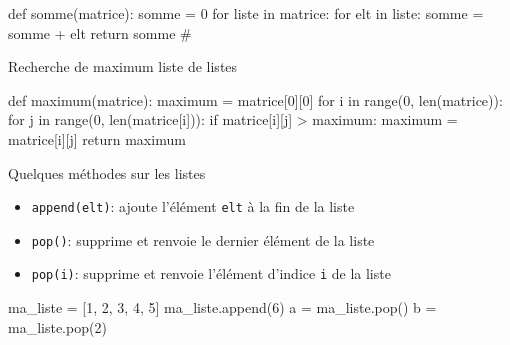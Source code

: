 \begin{minipage}{0.44\linewidth}
\begin{easybox}{}
		\begin{CodePythontexAlt}[TaillePolice=\normalsize, Largeur=1\linewidth,Centre,PremLigne=1, Lignes=false]{}
def somme(matrice):
	somme = 0
	for liste in matrice:
		for elt in liste:
			somme = somme + elt
	return somme
#
		\end{CodePythontexAlt}
\end{easybox}
\end{minipage}\hfill
	\begin{minipage}{0.55\linewidth}
		\begin{easybox}{Recherche de maximum liste de listes}{}
\begin{CodePythontexAlt}[TaillePolice=\normalsize, Largeur=1\linewidth,Centre,PremLigne=1, Lignes=false]{}
def maximum(matrice):
	maximum = matrice[0][0]
	for i in range(0, len(matrice)):
		for j in range(0, len(matrice[i])):
			if matrice[i][j] > maximum:
				maximum = matrice[i][j]
	return maximum
\end{CodePythontexAlt}
	\end{easybox}
	\end{minipage}


\begin{easybox}{Quelques méthodes sur les listes}{}

	\begin{minipage}{0.65\linewidth}
		\begin{itemize}
\item \verb|append(elt)|: ajoute l'élément \verb|elt| à la fin de la liste	
\item \verb|pop()|: supprime et renvoie le dernier élément de la liste
\item \verb|pop(i)|: supprime et renvoie l'élément d'indice \verb|i| de la liste
\end{itemize}

	\end{minipage}\hfill
	\begin{minipage}{0.35\linewidth}
	\begin{CodePythontexAlt}[TaillePolice=\normalsize, Largeur=1\linewidth,Centre,PremLigne=1, Lignes=false]{}
ma_liste = [1, 2, 3, 4, 5]
ma_liste.append(6)
a = ma_liste.pop()
b = ma_liste.pop(2)
		\end{CodePythontexAlt}
	\end{minipage}
\end{easybox}

